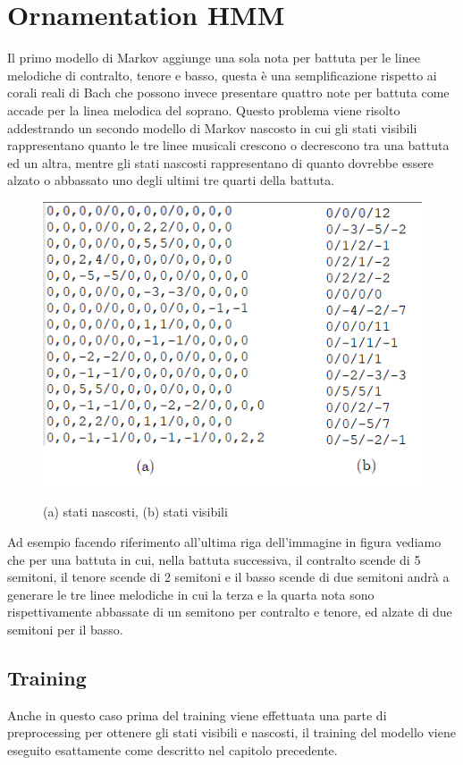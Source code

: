 \chapter{Ornamentation HMM}\label{ch:hmm-ornamentation}
Il primo modello di Markov aggiunge una sola nota per battuta per le linee melodiche di contralto, tenore e basso, questa è una semplificazione rispetto ai corali reali di Bach che possono invece presentare quattro note per battuta come accade per la linea melodica del soprano. Questo problema viene risolto addestrando un secondo modello di Markov nascosto in cui gli stati visibili rappresentano quanto le tre linee musicali crescono o decrescono tra una battuta ed un altra, mentre gli stati nascosti rappresentano di quanto dovrebbe essere alzato o abbassato uno degli ultimi tre quarti della battuta. 
\begin{figure}[H]
	\centering
	\caption{(a) stati nascosti, (b) stati visibili}
	\includegraphics{figures/hid-vis-orn.png}
	\label{hid-vis-orn}
\end{figure}
\noindent
Ad esempio facendo riferimento all'ultima riga dell'immagine in figura vediamo che per una battuta in cui, nella battuta successiva, il contralto scende di 5 semitoni, il tenore scende di 2 semitoni e il basso scende di due semitoni andrà a generare le tre linee melodiche in cui la terza e la quarta nota sono rispettivamente abbassate di un semitono per contralto e tenore, ed alzate di due semitoni per il basso.
\section{Training}
Anche in questo caso prima del training viene effettuata una parte di preprocessing per ottenere gli stati visibili e nascosti, il training del modello viene eseguito esattamente come descritto nel capitolo precedente.
